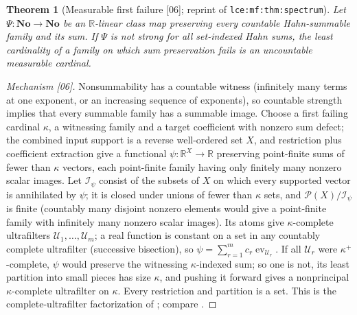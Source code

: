 \documentclass[11pt,a4paper]{article}
\numberwithin{equation}{section}
\theoremstyle{plain}
\newtheorem{theorem}{Theorem}[section]
\theoremstyle{definition}
\theoremstyle{remark}
\newcommand{\No}{\mathbf{No}}
\newcommand{\R}{\mathbb{R}}
\newcommand{\lbl}[1]{\nolinkurl{#1}}%
\newcommand{\src}[1]{\textup{\textsf{\small[#1]}}}%
\begin{document}
\begin{theorem}[Measurable first failure \src{06}; reprint of \lbl{lce:mf:thm:spectrum}]\label{sse:sr:found:prop:firstfailure}
Let $\Psi:\No\to\No$ be an $\R$-linear class map preserving every countable
Hahn-summable family and its sum. If $\Psi$ is not strong for all set-indexed
Hahn sums, the least cardinality of a family on which sum preservation fails is
an uncountable measurable cardinal.
\end{theorem}
\begin{proof}[Mechanism \src{06}]
Nonsummability has a countable witness (infinitely many terms at one exponent,
or an increasing sequence of exponents), so countable strength implies that
every summable family has a summable image. Choose a first failing cardinal
$\kappa$, a witnessing family and a target coefficient with nonzero sum defect;
the combined input support is a reverse well-ordered set $X$, and restriction
plus coefficient extraction give a functional $\psi:\R^X\to\R$ preserving
point-finite sums of fewer than $\kappa$ vectors, each point-finite family
having only finitely many nonzero scalar images. Let $\mathcal I_\psi$ consist of
the subsets of $X$ on which every supported vector is annihilated by $\psi$;
it is closed under unions of fewer than $\kappa$ sets, and
$\mathcal P(X)/\mathcal I_\psi$ is finite (countably many disjoint nonzero
elements would give a point-finite family with infinitely many nonzero scalar
images). Its atoms give $\kappa$-complete ultrafilters
$\mathcal U_1,\dots,\mathcal U_m$; a real function is constant on a set in any
countably complete ultrafilter (successive bisection), so
$\psi=\sum_{r=1}^mc_r\operatorname{ev}_{\mathcal U_r}$. If all $\mathcal U_r$ were
$\kappa^+$-complete, $\psi$ would preserve the witnessing $\kappa$-indexed sum;
so one is not, its least partition into small pieces has size $\kappa$, and
pushing it forward gives a nonprincipal $\kappa$-complete ultrafilter on
$\kappa$. Every restriction and partition is a set. This is the
complete-ultrafilter factorization of \cite{sr-RepoLCE}; compare \cite{sr-Bergman}.
\end{proof}
\end{document}
